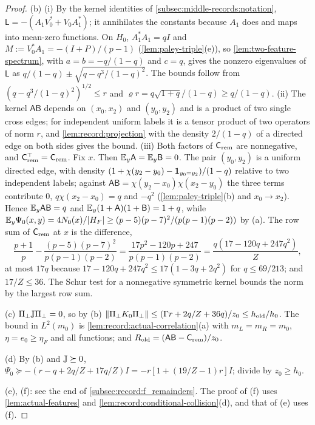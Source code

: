 \begin{proof}
(b) (i) By the kernel identities of \cref{subsec:middle-records:notation},
$\mathsf L=-(A_1V_0^*+V_0A_1^*)$; it annihilates the constants because $A_1$
does and maps into mean-zero functions. On $H_0$, $A_1^*A_1=qI$ and
$M:=V_0^*A_1=-(I+P)/(p-1)$ (\cref{lem:paley-triple}(e)), so \cref{lem:two-feature-spectrum}, with
$a=b=-q/(1-q)$ and $c=q$, gives the nonzero eigenvalues of $\mathsf L$ as
$q/(1-q)\pm\sqrt{q-q^3/(1-q)^2}$. The
bounds follow from $(q-q^3/(1-q)^2)^{1/2}\le r$ and
$\varrho r=q\sqrt{1+q}/(1-q)\ge q/(1-q)$.
(ii) The kernel $\mathsf A\mathsf B$ depends on $(x_0,x_2)$ and $(y_0,y_2)$
and is a product of two single cross edges; for independent uniform labels it
is a tensor product of two operators of norm $r$, and
\cref{lem:record:projection} with the density $2/(1-q)$ of a directed edge on
both sides gives the bound.
(iii) Both factors of $\mathsf C_{\rm rem}$ are nonnegative, and
$\mathsf C_{\rm rem}^\top=\mathsf C_{\rm rem}$. Fix $x$. Then
$\mathbb E_y\mathsf A=\mathbb E_y\mathsf B=0$. The pair $(y_0,y_2)$ is a uniform directed
edge, with density $(1+\chi(y_2-y_0)-\mathbf 1_{y_0=y_2})/(1-q)$ relative to two
independent labels; against $\mathsf A\mathsf B=\chi(y_2-x_0)\chi(x_2-y_0)$ the
three terms contribute $0$, $q\chi(x_2-x_0)=q$ and $-q^2$
(\cref{lem:paley-triple}(b) and $x_0\to x_2$). Hence $\mathbb E_y\mathsf A\mathsf B=q$
and $\mathbb E_y(1+\mathsf A)(1+\mathsf B)=1+q$, while
$\mathbb E_y\Psi_0(x,y)=4N_0(x)/|H_F|\ge(p-5)(p-7)^2/(p(p-1)(p-2))$ by (a). The row sum
of $\mathsf C_{\rm rem}$ at $x$ is the difference,
\[
 \frac{p+1}p-\frac{(p-5)(p-7)^2}{p(p-1)(p-2)}
 =\frac{17p^2-120p+247}{p(p-1)(p-2)}=\frac{q(17-120q+247q^2)}Z ,
\]
at most $17q$ because $17-120q+247q^2\le17(1-3q+2q^2)$ for $q\le69/213$; and
$17/Z\le36$. The Schur test for a nonnegative symmetric kernel bounds the norm
by the largest row sum.

(c) $\Pi_\perp\mathbb J\Pi_\perp=0$, so by (b)
$\|\Pi_\perp K_0\Pi_\perp\|\le(\Gamma r+2q/Z+36q)/z_0\le h_{\rm old}/h_0$. The bound
in $L^2(m_0)$ is \cref{lem:record:actual-correlation}(a) with $m_L=m_R=m_0$,
$\eta=e_0\ge\eta_F$ and all functions; and
$R_{\rm old}=(\mathsf A\mathsf B-\mathsf C_{\rm rem})/z_0$.

(d) By (b) and $\mathbb J\succeq0$,
$\Psi_0\succeq-(r-q+2q/Z+17q/Z)I=-r[1+(19/Z-1)r]I$; divide by $z_0\ge h_0$.

(e), (f): see the end of \cref{subsec:record:f_remainders}. The proof of (f)
uses \cref{lem:actual-features} and \cref{lem:record:conditional-collision}(d),
and that of (e) uses (f).
\end{proof}

